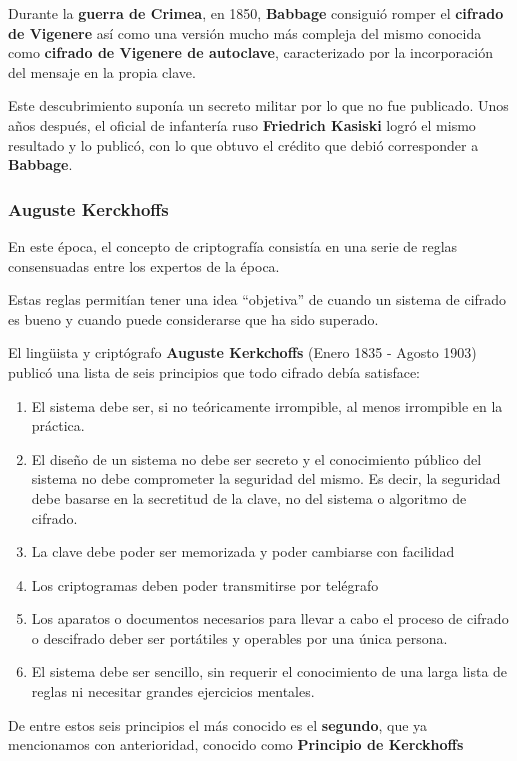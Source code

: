\documentclass[nochap]{apuntesURJC}
\begin{document}
Durante la \textbf{guerra de Crimea}, en 1850, \textbf{Babbage} consiguió romper el \textbf{cifrado de Vigenere} así como una versión mucho más compleja del mismo conocida como \textbf{cifrado de Vigenere de autoclave}, caracterizado por la incorporación del mensaje en la propia clave.

Este descubrimiento suponía un secreto militar por lo que no fue publicado. Unos años después, el oficial de infantería ruso \textbf{Friedrich Kasiski} logró el mismo resultado y lo publicó, con lo que obtuvo el crédito que debió corresponder a \textbf{Babbage}.

\subsubsection{Auguste Kerckhoffs}
En este época, el concepto de criptografía consistía en una serie de reglas consensuadas entre los expertos de la época.

Estas reglas permitían tener una idea ``objetiva'' de cuando un sistema de cifrado es bueno y cuando puede considerarse que ha sido superado.

El lingüista y criptógrafo \textbf{Auguste Kerkchoffs} (Enero 1835 - Agosto 1903) publicó una lista de seis principios que todo cifrado debía satisface:
\begin{enumerate}
\item El sistema debe ser, si no teóricamente irrompible, al menos irrompible en la práctica.
\item El diseño de un sistema no debe ser secreto y el conocimiento público del sistema no debe comprometer la seguridad del mismo. Es decir, la seguridad debe basarse en la secretitud de la clave, no del sistema o algoritmo de cifrado.
\item La clave debe poder ser memorizada y poder cambiarse con facilidad
\item Los criptogramas deben poder transmitirse por telégrafo
\item Los aparatos o documentos necesarios para llevar a cabo el proceso de cifrado o descifrado deber ser portátiles y operables por una única persona.
\item El sistema debe ser sencillo, sin requerir el conocimiento de una larga lista de reglas ni necesitar grandes ejercicios mentales.
\end{enumerate}

De entre estos seis principios el más conocido es el \textbf{segundo}, que ya mencionamos con anterioridad, conocido como \textbf{Principio de Kerckhoffs}
\end{document}
